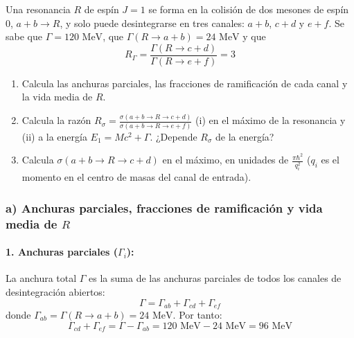 \newpage
\begin{problema}
Una resonancia $R$ de espín $J = 1$ se forma en la colisión de dos mesones de espín 0, $a + b \longrightarrow R$, y solo puede desintegrarse en tres canales: $a + b$, $c + d$ y $e + f$. Se sabe que $\Gamma = 120\text{ MeV}$, que $\Gamma(R \rightarrow a+b) = 24\text{ MeV}$ y que
\begin{equation*}
R_\Gamma = \frac{\Gamma(R \rightarrow c+d)}{\Gamma(R \rightarrow e+f)} = 3
\end{equation*}

\begin{enumerate}[label=\alph*)]
    \item Calcula las anchuras parciales, las fracciones de ramificación de cada canal y la vida media de $R$.
    \item Calcula la razón $R_\sigma = \frac{\sigma(a+b \rightarrow R \rightarrow c+d)}{\sigma(a+b \rightarrow R \rightarrow e+f)}$ (i) en el máximo de la resonancia y (ii) a la energía $E_1 = M c^2 + \Gamma$. ¿Depende $R_\sigma$ de la energía?
    \item Calcula $\sigma(a+b \rightarrow R \rightarrow c+d)$ en el máximo, en unidades de $\frac{\pi\hbar^2}{q_i^2}$ ($q_i$ es el momento en el centro de masas del canal de entrada).
\end{enumerate}

\tcblower

\subsubsection*{a) Anchuras parciales, fracciones de ramificación y vida media de $R$}

\paragraph{1. Anchuras parciales ($\Gamma_i$):}
La anchura total $\Gamma$ es la suma de las anchuras parciales de todos los canales de desintegración abiertos:
\begin{equation*}
\Gamma = \Gamma_{ab} + \Gamma_{cd} + \Gamma_{ef}
\end{equation*}
donde $\Gamma_{ab} = \Gamma(R \to a+b) = 24\text{ MeV}$. Por tanto:
\begin{equation*}
\Gamma_{cd} + \Gamma_{ef} = \Gamma - \Gamma_{ab} = 120\text{ MeV} - 24\text{ MeV} = 96\text{ MeV}
\end{equation*}


\end{problema}
